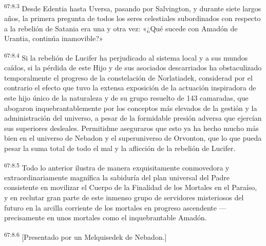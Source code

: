 \par
\textsuperscript{67:8.3} Desde Edentia hasta Uversa, pasando por Salvington, y durante siete largos años, la primera pregunta de todos los seres celestiales subordinados con respecto a la rebelión de Satania era una y otra vez: «¿Qué sucede con Amadón de Urantia, continúa inamovible?»

\par
\textsuperscript{67:8.4} Si la rebelión de Lucifer ha perjudicado al sistema local y a sus mundos caídos, si la pérdida de este Hijo y de sus asociados descarriados ha obstaculizado temporalmente el progreso de la constelación de Norlatiadek, considerad por el contrario el efecto que tuvo la extensa exposición de la actuación inspiradora de este hijo único de la naturaleza y de su grupo resuelto de 143 camaradas, que abogaron inquebrantablemente por los conceptos más elevados de la gestión y la administración del universo, a pesar de la formidable presión adversa que ejercían sus superiores desleales. Permitidme aseguraros que esto ya ha hecho mucho más bien en el universo de Nebadon y el superuniverso de Orvonton, que lo que pueda pesar la suma total de todo el mal y la aflicción de la rebelión de Lucifer.

\par
\textsuperscript{67:8.5} Todo lo anterior ilustra de manera exquisitamente conmovedora y extraordinariamente magnífica la sabiduría del plan universal del Padre consistente en movilizar el Cuerpo de la Finalidad de los Mortales en el Paraíso, y en reclutar gran parte de este inmenso grupo de servidores misteriosos del futuro en la arcilla corriente de los mortales en progreso ascendente ---precisamente en unos mortales como el inquebrantable Amadón.

\par
\textsuperscript{67:8.6} [Presentado por un Melquisedek de Nebadon.]